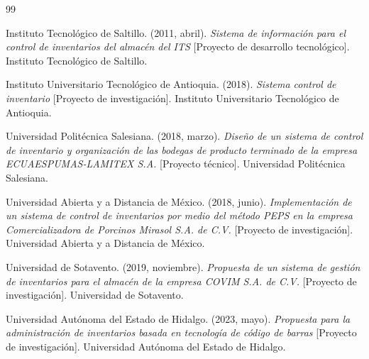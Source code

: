 \clearpage
{}
\renewcommand{\bibname}{Bibliografía}

\begin{thebibliography}{99}

    Instituto Tecnológico de Saltillo. (2011, abril). \textit{Sistema de información para el
    control de inventarios del almacén del ITS} [Proyecto de desarrollo tecnológico].
    Instituto Tecnológico de Saltillo.

    Instituto Universitario Tecnológico de Antioquia. (2018). \textit{Sistema control de
    inventario} [Proyecto de investigación].
    Instituto Universitario Tecnológico de Antioquia.

    Universidad Politécnica Salesiana. (2018, marzo). \textit{Diseño de un sistema de control
    de inventario y organización de las bodegas de producto terminado de la empresa
    ECUAESPUMAS-LAMITEX S.A.} [Proyecto técnico].
    Universidad Politécnica Salesiana.

    Universidad Abierta y a Distancia de México. (2018, junio). \textit{Implementación de un
    sistema de control de inventarios por medio del método PEPS en la empresa
    Comercializadora de Porcinos Mirasol S.A. de C.V.} [Proyecto de investigación].
    Universidad Abierta y a Distancia de México.

    Universidad de Sotavento. (2019, noviembre). \textit{Propuesta de un sistema de gestión
    de inventarios para el almacén de la empresa COVIM S.A. de C.V.} [Proyecto de
    investigación]. Universidad de Sotavento.

    Universidad Autónoma del Estado de Hidalgo. (2023, mayo). \textit{Propuesta para la
    administración de inventarios basada en tecnología de código de barras} [Proyecto de
    investigación]. Universidad Autónoma del Estado de Hidalgo.

\end{thebibliography}
\clearpage
